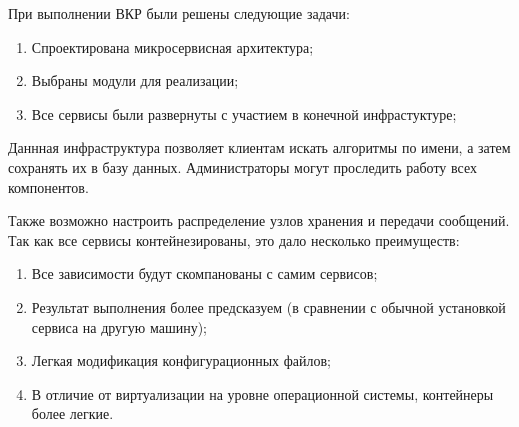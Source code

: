\Conclusion %

При выполнении ВКР были решены следующие задачи:
\begin{enumerate}[label=\arabic*.]
    \item Спроектирована микросервисная архитектура;
    \item Выбраны модули для реализации;
    \item Все сервисы были развернуты с участием в конечной инфрастуктуре;
\end{enumerate}

Даннная инфраструктура позволяет клиентам искать алгоритмы по имени, а затем
сохранять их в базу данных. Администраторы могут проследить работу всех
компонентов.

Также возможно настроить распределение узлов хранения и передачи сообщений. Так
как все сервисы контейнезированы, это дало несколько преимуществ:
\begin{enumerate}[label=\arabic*.]
    \item Все зависимости будут скомпанованы с самим сервисов;
    \item Результат выполнения более предсказуем (в сравнении с обычной
        установкой сервиса на другую машину);
    \item Легкая модификация конфигурационных файлов;
    \item В отличие от виртуализации на уровне операционной системы,
        контейнеры более легкие.
\end{enumerate}


